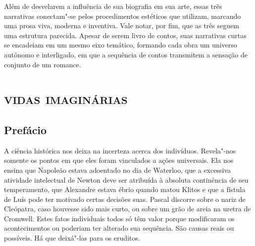Além de desvelarem a influência de sua biografia em sua arte, essas três narrativas conectam"-se pelos procedimentos estéticos que utilizam, marcando uma prosa viva, moderna e inventiva. Vale notar, por fim, que as três seguem uma estrutura parecida. Apesar de serem livro de contos, suas narrativas curtas se encadeiam em um mesmo eixo temático, formando cada obra um universo autônomo e interligado, em que a sequência de contos transmitem a sensação de conjunto de um romance.

\part{\textsc{vidas imaginárias}}

\chapter{Prefácio}


A ciência histórica nos deixa na incerteza acerca dos indivíduos.
Revela"-nos somente os pontos em que eles foram vinculados a ações
universais. Ela nos ensina que Napoleão estava adoentado no dia de
Waterloo, que a excessiva atividade intelectual de Newton deve ser
atribuída à absoluta continência de seu temperamento, que Alexandre estava
ébrio quando matou Klitos e que a fístula de Luís  pode ter motivado
certas decisões suas. Pascal discorre sobre o nariz de Cleópatra, caso
houvesse sido mais curto, ou sobre um grão de areia na uretra de Cromwell.
Estes fatos individuais todos só têm valor porque modificaram os
acontecimentos ou poderiam ter alterado sua sequência. São causas reais ou
possíveis. Há que deixá"-las para os eruditos.


